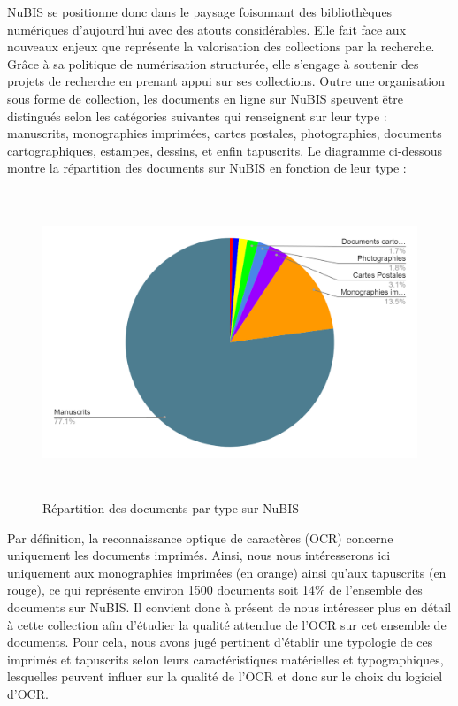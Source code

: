 \documentclass[a4paper,12pt,twoside]{book}
\begin{document}
NuBIS se positionne donc dans le paysage foisonnant des bibliothèques numériques d'aujourd'hui avec des atouts considérables. Elle fait face aux nouveaux enjeux que représente la valorisation des collections par la recherche. Grâce à sa politique de numérisation structurée, elle s'engage à soutenir des projets de recherche en prenant appui sur ses collections. Outre une organisation sous forme de collection, les documents en ligne sur NuBIS speuvent être distingués selon  les catégories
suivantes qui renseignent sur leur type : manuscrits, monographies imprimées, cartes postales,
photographies, documents cartographiques, estampes, dessins, et enfin
tapuscrits. Le diagramme ci-dessous montre la répartition des documents
sur NuBIS en fonction de leur type : \\

\begin{figure} [H]
	\includegraphics[width=5.83194in,height=3.60972in]{vertopal_157ae480aa4a4b07be198b586a812241/media/image2.png}
	\caption{Répartition des documents par type sur NuBIS}
\end{figure}

Par définition, la reconnaissance optique de caractères (OCR) concerne
uniquement les documents imprimés. Ainsi, nous nous intéresserons ici
uniquement aux monographies imprimées (en orange) ainsi qu'aux
tapuscrits (en rouge), ce qui représente environ 1500 documents soit
14\% de l'ensemble des documents sur NuBIS. Il convient donc à présent
de nous intéresser plus en détail à cette collection afin d'étudier la
qualité attendue de l'OCR sur cet ensemble de documents. Pour cela, nous
avons jugé pertinent d'établir une typologie de ces imprimés et
tapuscrits selon leurs caractéristiques matérielles et typographiques,
lesquelles peuvent influer sur la qualité de l'OCR et donc sur le choix
du logiciel d'OCR. 
\end{document}
